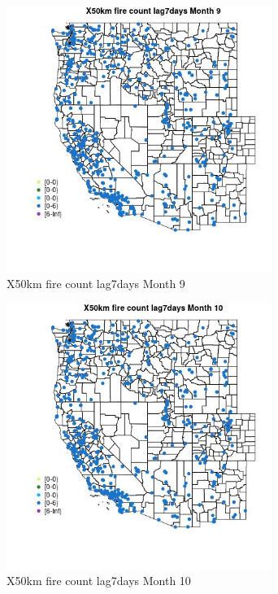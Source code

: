 \begin{figure} 
\centering  
\includegraphics[width=0.77\textwidth]{Code_Outputs/Report_ML_input_PM25_Step4_part_e_de_duplicated_aves_compiled_2019-05-14wNAs_MapObsMo9X50km_fire_count_lag7days.jpg} 
\caption{\label{fig:Report_ML_input_PM25_Step4_part_e_de_duplicated_aves_compiled_2019-05-14wNAsMapObsMo9X50km_fire_count_lag7days}X50km fire count lag7days Month 9} 
\end{figure} 
 

\begin{figure} 
\centering  
\includegraphics[width=0.77\textwidth]{Code_Outputs/Report_ML_input_PM25_Step4_part_e_de_duplicated_aves_compiled_2019-05-14wNAs_MapObsMo10X50km_fire_count_lag7days.jpg} 
\caption{\label{fig:Report_ML_input_PM25_Step4_part_e_de_duplicated_aves_compiled_2019-05-14wNAsMapObsMo10X50km_fire_count_lag7days}X50km fire count lag7days Month 10} 
\end{figure} 
 

